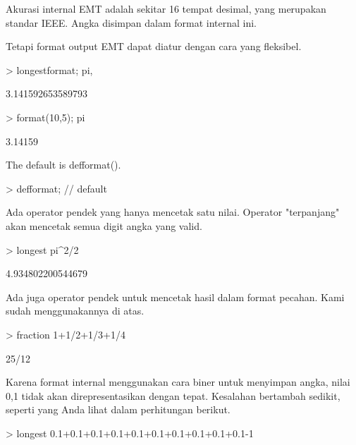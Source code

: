\documentclass[a4paper,10pt]{article}
\begin{document}
\begin{eulernotebook}
\begin{eulercomment}
\begin{eulercomment}
\begin{eulercomment}
Akurasi internal EMT adalah sekitar 16 tempat desimal, yang merupakan
standar IEEE. Angka disimpan dalam format internal ini.

Tetapi format output EMT dapat diatur dengan cara yang fleksibel.
\end{eulercomment}
\begin{eulerprompt}
> longestformat; pi,
\end{eulerprompt}
\begin{euleroutput}
  3.141592653589793
\end{euleroutput}
\begin{eulerprompt}
> format(10,5); pi
\end{eulerprompt}
\begin{euleroutput}
    3.14159 
\end{euleroutput}
\begin{eulercomment}
The default is defformat().
\end{eulercomment}
\begin{eulerprompt}
> defformat; // default
\end{eulerprompt}
\begin{eulercomment}
Ada operator pendek yang hanya mencetak satu nilai. Operator
"terpanjang" akan mencetak semua digit angka yang valid.
\end{eulercomment}
\begin{eulerprompt}
> longest pi^2/2
\end{eulerprompt}
\begin{euleroutput}
        4.934802200544679 
\end{euleroutput}
\begin{eulercomment}
Ada juga operator pendek untuk mencetak hasil dalam format pecahan.
Kami sudah menggunakannya di atas.
\end{eulercomment}
\begin{eulerprompt}
> fraction 1+1/2+1/3+1/4
\end{eulerprompt}
\begin{euleroutput}
  25/12
\end{euleroutput}
\begin{eulercomment}
Karena format internal menggunakan cara biner untuk menyimpan angka,
nilai 0,1 tidak akan direpresentasikan dengan tepat. Kesalahan
bertambah sedikit, seperti yang Anda lihat dalam perhitungan berikut.
\end{eulercomment}
\begin{eulerprompt}
> longest 0.1+0.1+0.1+0.1+0.1+0.1+0.1+0.1+0.1+0.1-1
\end{eulerprompt}

\end{eulercomment}
\end{eulercomment}
\end{eulernotebook}
\end{document}
